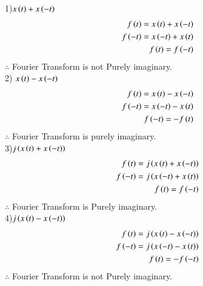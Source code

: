 \documentclass[journal,12pt,twocolumn]{IEEEtran}
\theoremstyle{remark}
\begin{document}
1)$x\left(t\right) + x\left(-t\right)$\\
\begin{align}
  f\left(t\right)= x\left(t\right) + x\left(-t\right)\\
  f\left(-t\right)=x\left(-t\right) + x\left(t\right)\\
  f\left(t\right)=f\left(-t\right)
\end{align}
$\therefore$ Fourier Transform is not Purely imaginary.\\
2) $x\left(t\right) - x\left(-t\right)$\\
\begin{align}
  f\left(t\right)= x\left(t\right) - x\left(-t\right)\\
  f\left(-t\right)=x\left(-t\right) - x\left(t\right)\\
  f\left(-t\right)=-f\left(t\right)
\end{align}
$\therefore$ Fourier Transform is purely imaginary.\\
3)$j\left(x\left(t\right) + x\left(-t\right)\right)$
\begin{align}
  f\left(t\right)=j\left(x\left(t\right) + x\left(-t\right)\right)\\
  f\left(-t\right)=j\left(x\left(-t\right) + x\left(t\right)\right)\\
  f\left(t\right)=f\left(-t\right)
\end{align}
$\therefore$ Fourier Transform is Purely imaginary.\\
4)$j\left(x\left(t\right) - x\left(-t\right)\right)$
\begin{align}
   f\left(t\right)=j\left(x\left(t\right) - x\left(-t\right)\right)\\
  f\left(-t\right)=j\left(x\left(-t\right) - x\left(t\right)\right)\\
  f\left(t\right)=-f\left(-t\right)
\end{align}
$\therefore$ Fourier Transform is not Purely imaginary.\\
\end{document}
